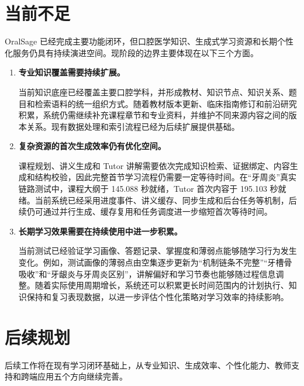 \section{当前不足}

OralSage 已经完成主要功能闭环，但口腔医学知识、生成式学习资源和长期个性化服务仍具有持续演进空间。现阶段的边界主要体现在以下三个方面。

\begin{enumerate}
  \item \textbf{专业知识覆盖需要持续扩展。}

  当前知识底座已经覆盖主要口腔学科，并形成教材、知识节点、知识关系、题目和检索语料的统一组织方式。随着教材版本更新、临床指南修订和前沿研究积累，系统仍需继续补充课程章节和专业资料，并维护不同来源内容之间的版本关系。现有数据处理和索引流程已经为后续扩展提供基础。

  \item \textbf{复杂资源的首次生成效率仍有优化空间。}

  课程规划、讲义生成和 Tutor 讲解需要依次完成知识检索、证据绑定、内容生成和结构校验，因此完整首节学习流程仍需要一定等待时间。在“牙周炎”真实链路测试中，课程大纲于 145.088 秒就绪，Tutor 首次内容于 195.103 秒就绪。当前系统已经采用进度事件、讲义缓存、同步生成和后台任务等机制，后续仍可通过并行生成、缓存复用和任务调度进一步缩短首次等待时间。

  \item \textbf{长期学习效果需要在持续使用中进一步积累。}

  当前测试已经验证学习画像、答题记录、掌握度和薄弱点能够随学习行为发生变化。例如，测试画像的薄弱点由空集逐步更新为“机制链条不完整”“牙槽骨吸收”和“牙龈炎与牙周炎区别”，讲解偏好和学习节奏也能够随过程信息调整。随着实际使用周期增长，系统还可以积累更长时间范围内的计划执行、知识保持和复习表现数据，以进一步评估个性化策略对学习效率的持续影响。
\end{enumerate}

\section{后续规划}

后续工作将在现有学习闭环基础上，从专业知识、生成效率、个性化能力、教师支持和跨端应用五个方向继续完善。

